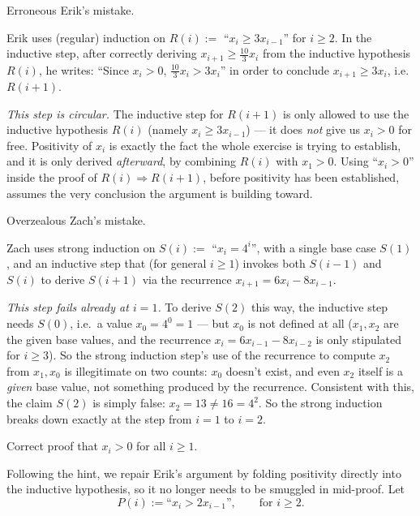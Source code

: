\documentclass[11pt]{article}
\newcommand{\partlabel}[1]{%
    \noindent\makebox[2em][l]{\textbf{(#1)}}%
}
\begin{document}
\medskip
\partlabel{b}
Erroneous Erik's mistake.

Erik uses (regular) induction on $R(i) := $ ``$x_i \ge 3x_{i-1}$'' for $i \ge 2$. In the inductive step, after correctly deriving $x_{i+1} \ge \tfrac{10}{3}x_i$ from the inductive hypothesis $R(i)$, he writes: ``Since $x_i > 0$, $\tfrac{10}{3}x_i > 3x_i$'' in order to conclude $x_{i+1} \ge 3x_i$, i.e.\ $R(i+1)$.

\emph{This step is circular.} The inductive step for $R(i+1)$ is only allowed to use the inductive hypothesis $R(i)$ (namely $x_i \ge 3x_{i-1}$) — it does \emph{not} give us $x_i > 0$ for free. Positivity of $x_i$ is exactly the fact the whole exercise is trying to establish, and it is only derived \emph{afterward}, by combining $R(i)$ with $x_1 > 0$. Using ``$x_i > 0$'' inside the proof of $R(i)\Rightarrow R(i+1)$, before positivity has been established, assumes the very conclusion the argument is building toward.

\medskip
\partlabel{c}
Overzealous Zach's mistake.

Zach uses strong induction on $S(i) := $ ``$x_i = 4^i$'', with a single base case $S(1)$, and an inductive step that (for general $i\ge 1$) invokes both $S(i-1)$ and $S(i)$ to derive $S(i+1)$ via the recurrence $x_{i+1} = 6x_i - 8x_{i-1}$.

\emph{This step fails already at $i = 1$.} To derive $S(2)$ this way, the inductive step needs $S(0)$, i.e.\ a value $x_0 = 4^0 = 1$ — but $x_0$ is not defined at all ($x_1, x_2$ are the given base values, and the recurrence $x_i = 6x_{i-1}-8x_{i-2}$ is only stipulated for $i \ge 3$). So the strong induction step's use of the recurrence to compute $x_2$ from $x_1, x_0$ is illegitimate on two counts: $x_0$ doesn't exist, and even $x_2$ itself is a \emph{given} base value, not something produced by the recurrence. Consistent with this, the claim $S(2)$ is simply false: $x_2 = 13 \ne 16 = 4^2$. So the strong induction breaks down exactly at the step from $i=1$ to $i=2$.

\bigskip
\partlabel{d}
Correct proof that $x_i > 0$ for all $i \ge 1$.

Following the hint, we repair Erik's argument by folding positivity directly into the inductive hypothesis, so it no longer needs to be smuggled in mid-proof. Let
\[
P(i) := \text{``}x_i > 2x_{i-1}\text{''}, \qquad \text{for } i \ge 2.
\]
\end{document}
